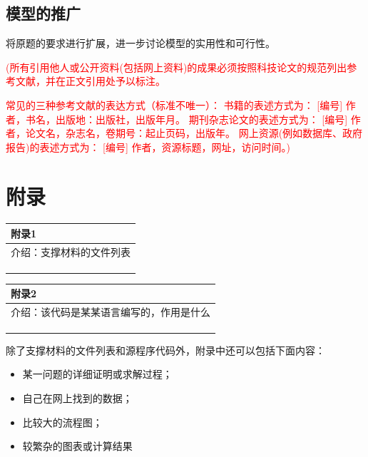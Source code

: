 \documentclass{my_paper}
\begin{document}
\subsection{模型的推广}
将原题的要求进行扩展\cite{rossler1979equation}，进一步讨论模型的实用性和可行性\cite{mckean1970nagumo}。

\begin{center}
\end{center}
\textcolor{red}{(所有引用他人或公开资料(包括网上资料)的成果必须按照科技论文的规范列出参考文献，并在正文引用处予以标注。}

\textcolor{red}{常见的三种参考文献的表达方式（标准不唯一）：
书籍的表述方式为： [编号] 作者，书名，出版地：出版社，出版年月。
期刊杂志论文的表述方式为： [编号] 作者，论文名，杂志名，卷期号：起止页码，出版年。
网上资源(例如数据库、政府报告)的表述方式为： [编号] 作者，资源标题，网址，访问时间。)}
\newpage
\section{附录}

\begin{table}[htbp]
    \centering
    \begin{tabular}{|p{14.0cm}|}
    \hline
    \textbf{附录1} \\ %
    \hline
    介绍：支撑材料的文件列表  \\ 
    \\
    \\
    \\
    \hline
    \end{tabular}
\end{table}

\begin{table}[htbp]
    \centering
    \begin{tabular}{|p{14.0cm}|}
    \hline
    \textbf{附录2} \\ %
    \hline
    介绍：该代码是某某语言编写的，作用是什么   \\ 
    \\
    \\
    \\
    \hline
    \end{tabular}
\end{table}

除了支撑材料的文件列表和源程序代码外，附录中还可以包括下面内容：
\begin{itemize}
\item 某一问题的详细证明或求解过程；
\item 自己在网上找到的数据；
\item 比较大的流程图；
\item 较繁杂的图表或计算结果
\end{itemize}
\end{document}
